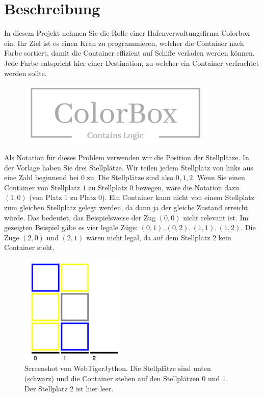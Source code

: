 \documentclass[a4paper,11pt,german,notitlepage]{report}
\begin{document}
\section*{Beschreibung}
In diesem Projekt nehmen Sie die Rolle einer Hafenverwaltungsfirma Colorbox ein.
Ihr Ziel ist es einen Kran zu programmieren, welcher die Container nach Farbe sortiert, damit die Container effizient auf Schiffe verladen werden können.
Jede Farbe entspricht hier einer Destination, zu welcher ein Container verfrachtet werden sollte.\\

\begin{figure}[h!]
    \centering
    \includegraphics[height=3cm]{logo.png}  
\end{figure}

Als Notation für dieses Problem verwenden wir die Position der Stellplätze.
In der Vorlage haben Sie drei Stellplätze.
Wir teilen jedem Stellplatz von links aus eine Zahl beginnend bei $0$ zu.
Die Stellplätze sind also $0,1,2$.
Wenn Sie einen Container von Stellplatz $1$ zu Stellplatz $0$ bewegen, wäre die Notation dazu $(1,0)$ (von Platz 1 zu Platz 0).
Ein Container kann nicht von einem Stellplatz zum gleichen Stellplatz gelegt werden, da dann ja der gleiche Zustand erreicht würde.
Das bedeutet, das Beispielsweise der Zug $(0,0)$ nicht relevant ist.
Im gezeigten Beispiel gäbe es vier legale Züge: $(0,1),(0,2),(1,1),(1,2)$. Die Züge $(2,0)$ und $(2,1)$ wären nicht legal, da auf dem Stellplatz $2$ kein Container steht.

\begin{figure}[h!]
    \centering
    \includegraphics[width=5cm]{container.png}    
    \caption{Screenshot von WebTigerJython. Die Stellplätze sind unten (schwarz) und die Container stehen auf den Stellplätzen $0$ und $1$. Der Stellplatz $2$ ist hier leer.}
\end{figure}
\end{document}
